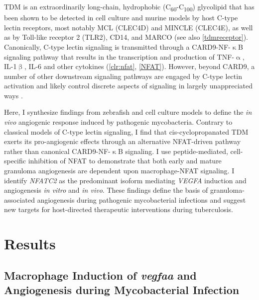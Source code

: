 TDM is an extraordinarily long\hyp{}chain, hydrophobic (C\textsubscript{60}\hyp{}C\textsubscript{100}) glycolipid \citep{Noll1956a, Noll1956b, Behling1993, Hunter2006a} that has been shown to be detected in cell culture and murine models by host C\hyp{}type lectin receptors, most notably MCL (CLEC4D) and MINCLE (CLEC4E), as well as by Toll\hyp{}like receptor 2 (TLR2), CD14, and MARCO \citep{Bowdish2009, Matsunaga2009, Ishikawa2009, Miyake2013} (see also \autoref{tdmreceptor}). Canonically, C\hyp{}type lectin signaling is transmitted through a CARD9\hyp{}NF\hyp{}$\upkappa$B signaling pathway that results in the transcription and production of TNF\hyp{}$\upalpha$, IL\hyp{}1$\upbeta$, IL\hyp{}6 and other cytokines \citep{Yamasaki2008, Goodridge2009, LobatoPascual2013, Zhao2014, Deerhake2021} (\autoref{clr:nfat}, \autoref{NFAT}). However, beyond CARD9, a number of other downstream signaling pathways are engaged by C\hyp{}type lectin activation and likely control discrete aspects of signaling in largely unappreciated ways \citep{Goodridge2007, Deerhake2021}.

Here, I synthesize findings from zebrafish and cell culture models to define the \textit{in vivo} angiogenic response induced by pathogenic mycobacteria. Contrary to classical models of C\hyp{}type lectin signaling, I find that cis\hyp{}cyclopropanated TDM exerts its pro\hyp{}angiogenic effects through an alternative NFAT\hyp{}driven pathway rather than canonical CARD9\hyp{}NF\hyp{}$\upkappa$B signaling. I use peptide\hyp{}mediated, cell\hyp{}specific inhibition of NFAT to demonstrate that both early and mature granuloma angiogenesis are dependent upon macrophage\hyp{}NFAT signaling. I identify \textit{NFATC2} as the predominant isoform mediating \textit{VEGFA} induction and angiogenesis \textit{in vitro} and \textit{in vivo}. These findings define the basis of granuloma\hyp{}associated angiogenesis during pathogenic mycobacterial infections and suggest new targets for host\hyp{}directed therapeutic interventions during tuberculosis.

\section{Results}

\subsection{Macrophage Induction of \textit{vegfaa} and Angiogenesis during Mycobacterial Infection}\label{extracellular}

